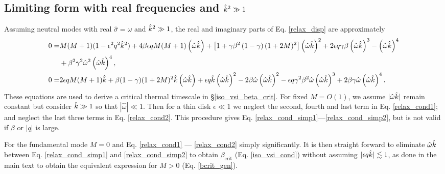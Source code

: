 \subsection{Limiting form with real frequencies and $\hat{k}^2\gg 1$}\label{disp_neut_limit}
Assuming neutral modes with real $\hat{\sigma}=\hat{\omega}$ and $\hat{k}^2\gg 1$, the real and imaginary parts of
Eq. \ref{relax_disp} are approximately 
\begin{align}
  0 =&M(M+1)(1-\epsilon^2 q^2 \hat{k}^2) + 4\beta\epsilon q M(M+1)\left(\hat{\omega}\hat{k}\right) 
 +\left[1 +
    \gamma\beta^2\left(1-\gamma\right)(1+2M)^2\right]\left(\hat{\omega}\hat{k}\right)^2
 + 2\epsilon q \gamma\beta \left(\hat{\omega}\hat{k}\right)^3 -  \left(\hat{\omega}\hat{k}\right)^4\notag \\
  &+ \beta^2\gamma^2\hat{\omega}^2
  \left(\hat{\omega}\hat{k}\right)^4,\label{relax_cond1} \\
   0=& 2\epsilon q M (M+1)\hat{k} +
   \beta(1-\gamma)(1+2M)^2\hat{k}\left(\hat{\omega}\hat{k}\right) 
   + \epsilon q \hat{k} \left(\hat{\omega}\hat{k}\right)^2 -
   2\beta\hat{\omega}\left(\hat{\omega}\hat{k}\right)^2
   - \epsilon q
   \gamma^2\beta^2\hat{\omega}\left(\hat{\omega}\hat{k}\right)^3 
   +
   2\beta\gamma\hat{\omega}\left(\hat{\omega}\hat{k}\right)^4 \label{relax_cond2}. 
\end{align}
These equations are used to derive a critical thermal timescale in
\S\ref{iso_vsi_beta_crit}. For fixed $M=O(1)$,  we assume
$|\hat{\omega}\hat{k}|$ remain constant but consider $\hat{k}\gg 1$ so
that $|\hat{\omega}|\ll 1$.  Then for a thin disk $\epsilon \ll 1$
we neglect the second, fourth and last term in Eq. \ref{relax_cond1};
and neglect the last three terms in Eq. \ref{relax_cond2}. This
procedure gives Eq. \ref{relax_cond_simp1}---\ref{relax_cond_simp2},
but is not valid if $\beta$ or $|q|$ is large. 

For the fundamental mode $M=0$ and Eq. \ref{relax_cond1} ---
\ref{relax_cond2} simply significantly. It is then straight
forward to eliminate $\hat{\omega}\hat{k}$ between 
Eq. \ref{relax_cond_simp1} and \ref{relax_cond_simp2} to obtain
$\beta_\mathrm{crit}$ (Eq. \ref{iso_vsi_cond}) without
assuming $|\epsilon q \hat{k}|\lesssim 1$, as done in the main text to obtain the
equivalent expression for $M>0$ (Eq. \ref{bcrit_gen}).





